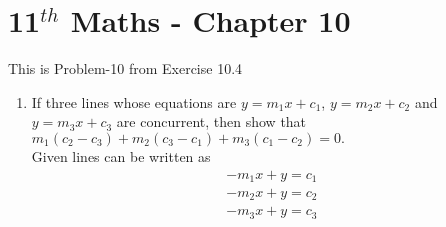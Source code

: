 \documentclass[12pt]{article}
\begin{document}
\section*{11$^{th}$ Maths - Chapter 10}
This is Problem-10 from Exercise 10.4
\begin{enumerate}
    \item If three lines whose equations are $y=m_1x+c_1$, $y=m_2x+c_2$ and $y=m_3x+c_3$ are concurrent, then show that $m_1(c_2-c_3)+m_2(c_3-c_1)+m_3(c_1-c_2) = 0.$\\
    \solution 
    Given lines can be written as \begin{align}
       -m_1x+y=c_1
    \end{align}
    \begin{align}
       -m_2x+y=c_2
    \end{align}
    \begin{align}
        -m_3x+y=c_3
        \label{eq:3}
    \end{align}
    

\end{enumerate}
\end{document}
